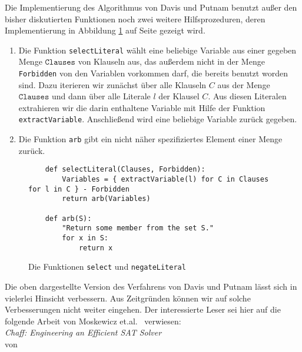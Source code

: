 Die Implementierung des Algorithmus von Davis und Putnam benutzt außer den bisher diskutierten Funktionen
noch zwei weitere Hilfsprozeduren, deren Implementierung in 
Abbildung \ref{fig:solve-aux} auf Seite \pageref{fig:solve-aux} gezeigt wird.
\begin{enumerate}
\item Die Funktion \texttt{selectLiteral} wählt eine beliebige Variable aus 
      einer gegeben Menge $\texttt{Clauses}$ von Klauseln aus, das außerdem nicht in der Menge
      \texttt{Forbidden} von den Variablen vorkommen darf, die bereits benutzt worden sind.
      Dazu iterieren wir zunächst über alle Klauseln $C$ aus der Menge $\texttt{Clauses}$ und dann über alle Literale $l$
      der Klausel $C$.  Aus diesen Literalen extrahieren wir die darin enthaltene Variable mit Hilfe der Funktion
      \texttt{extractVariable}.  Anschließend wird eine beliebige Variable zurück gegeben.
\item Die Funktion \texttt{arb} gibt ein nicht näher spezifiziertes Element einer Menge zurück.
\end{enumerate}
\begin{figure}[!ht]
  \centering
\begin{verbatim}
    def selectLiteral(Clauses, Forbidden):
        Variables = { extractVariable(l) for C in Clauses for l in C } - Forbidden
        return arb(Variables)
        
    def arb(S):
        "Return some member from the set S."
        for x in S:
            return x
\end{verbatim}
\vspace*{-0.3cm}
  \caption{Die Funktionen \texttt{select} und \texttt{negateLiteral}}
  \label{fig:solve-aux}
\end{figure}

Die oben dargestellte Version des Verfahrens von Davis und Putnam lässt sich in vielerlei
Hinsicht verbessern.  Aus Zeitgründen können wir auf solche Verbesserungen nicht
weiter eingehen. Der interessierte Leser sei hier auf die folgende Arbeit von Moskewicz
et.al.~\cite{moskewicz01}  verwiesen: 
\\[0.2cm]
\hspace*{1.3cm} \textsl{Chaff: Engineering an Efficient SAT Solver} \\
\hspace*{1.3cm} von  

